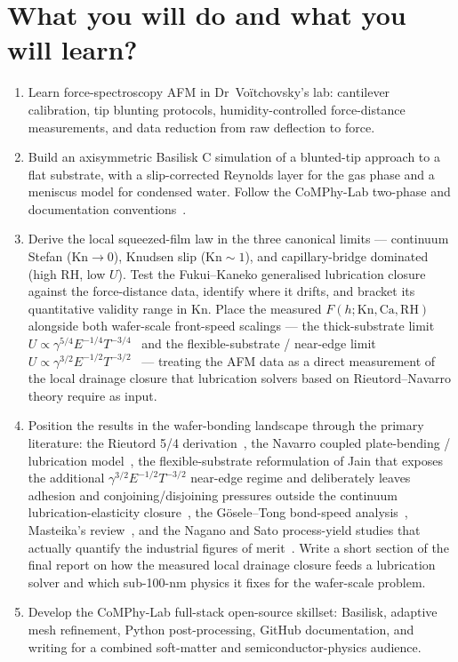 \documentclass[11pt]{article}
\begin{document}
\section*{What you will do and what you will learn?}

\begin{enumerate}
\itemsep0em
\item Learn force-spectroscopy AFM in Dr~Vo\"itchovsky's lab: cantilever calibration, tip blunting protocols, humidity-controlled force-distance measurements, and data reduction from raw deflection to force.
\item Build an axisymmetric Basilisk C simulation of a blunted-tip approach to a flat substrate, with a slip-corrected Reynolds layer for the gas phase and a meniscus model for condensed water. Follow the CoMPhy-Lab two-phase and documentation conventions~\citep{basiliskVatsal,basiliskVatsalDropFilm}.
\item Derive the local squeezed-film law in the three canonical limits --- continuum Stefan ($\mathrm{Kn} \to 0$), Knudsen slip ($\mathrm{Kn} \sim 1$), and capillary-bridge dominated (high RH, low $U$). Test the Fukui--Kaneko generalised lubrication closure~\citep{fukui1988analysis,fukui1990database} against the force-distance data, identify where it drifts, and bracket its quantitative validity range in $\mathrm{Kn}$. Place the measured $F(h; \mathrm{Kn}, \mathrm{Ca}, \mathrm{RH})$ alongside both wafer-scale front-speed scalings --- the thick-substrate limit $U \propto \gamma^{5/4} E^{-1/4} T^{-3/4}$~\citep{rieutord2005dynamics} and the flexible-substrate / near-edge limit $U \propto \gamma^{3/2} E^{-1/2} T^{-3/2}$~\citep{jain2026bond} --- treating the AFM data as a direct measurement of the local drainage closure that lubrication solvers based on Rieutord--Navarro theory require as input.
\item Position the results in the wafer-bonding landscape through the primary literature: the Rieutord 5/4 derivation~\citep{rieutord2005dynamics}, the Navarro coupled plate-bending / lubrication model~\citep{navarro2013direct}, the flexible-substrate reformulation of Jain that exposes the additional $\gamma^{3/2} E^{-1/2} T^{-3/2}$ near-edge regime and deliberately leaves adhesion and conjoining/disjoining pressures outside the continuum lubrication-elasticity closure~\citep{jain2026bond}, the G\"osele--Tong bond-speed analysis~\citep{gosele1995determines}, Masteika's review~\citep{masteika2014review}, and the Nagano and Sato process-yield studies that actually quantify the industrial figures of merit~\citep{nagano2022void,sato2025factors}. Write a short section of the final report on how the measured local drainage closure feeds a lubrication solver and which sub-100-nm physics it fixes for the wafer-scale problem.
\item Develop the CoMPhy-Lab full-stack open-source skillset: Basilisk, adaptive mesh refinement, Python post-processing, GitHub documentation, and writing for a combined soft-matter and semiconductor-physics audience.
\end{enumerate}
\end{document}
